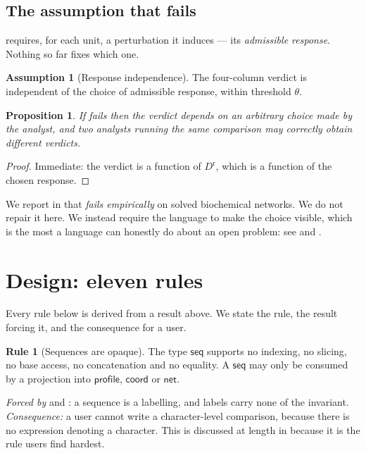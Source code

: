 \documentclass[11pt,twocolumn,a4paper]{article}
\theoremstyle{plain}
\newtheorem{proposition}[theorem]{Proposition}
\theoremstyle{definition}
\newtheorem{assumption}[theorem]{Assumption}
\newtheorem{drule}[theorem]{Rule}
\theoremstyle{remark}
\newcommand{\dem}{D}
\newcommand{\typ}[1]{\ensuremath{\mathsf{#1}}}
\begin{document}
\subsection{The assumption that fails}

 requires, for each unit, a perturbation it induces ---
its \emph{admissible response}. Nothing so far fixes which one.

\begin{assumption}[Response independence]
\label{ass:respind}
The four-column verdict is independent of the choice of admissible
response, within threshold $\theta$.
\end{assumption}

\begin{proposition}
\label{prop:respind}
If  fails then the verdict depends on an arbitrary
choice made by the analyst, and two analysts running the same comparison
may correctly obtain different verdicts.
\end{proposition}

\begin{proof}
Immediate: the verdict is a function of $\dem^{\mathrm{r}}$, which is a
function of the chosen response.
\end{proof}

We report in  that  \emph{fails
empirically} on solved biochemical networks. We do not repair it here.
We instead require the language to make the choice visible, which is the
most a language can honestly do about an open problem: see
 and .

\section{Design: eleven rules}
\label{sec:design}

Every rule below is derived from a result above. We state the rule, the
result forcing it, and the consequence for a user.

\begin{drule}[Sequences are opaque]
\label{rule:opaque}
The type \typ{seq} supports no indexing, no slicing, no base access, no
concatenation and no equality. A \typ{seq} may only be consumed by a
projection into \typ{profile}, \typ{coord} or \typ{net}.
\end{drule}
\noindent\emph{Forced by}  and : a
sequence is a labelling, and labels carry none of the invariant.
\emph{Consequence:} a user cannot write a character-level comparison,
because there is no expression denoting a character. This is discussed
at length in  because it is the rule users find hardest.
\end{document}
